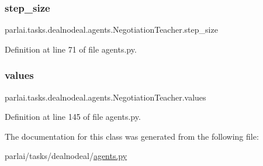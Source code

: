 \subsubsection{\texorpdfstring{step\+\_\+size}{step\_size}}
{\footnotesize\ttfamily parlai.\+tasks.\+dealnodeal.\+agents.\+Negotiation\+Teacher.\+step\+\_\+size}



Definition at line 71 of file agents.\+py.

\mbox{\label{classparlai_1_1tasks_1_1dealnodeal_1_1agents_1_1NegotiationTeacher_a9d33952ac00bfe1ca5a4b1f8311dc617}} 
\subsubsection{\texorpdfstring{values}{values}}
{\footnotesize\ttfamily parlai.\+tasks.\+dealnodeal.\+agents.\+Negotiation\+Teacher.\+values}



Definition at line 145 of file agents.\+py.



The documentation for this class was generated from the following file\+:\begin{DoxyCompactItemize}
\item 
parlai/tasks/dealnodeal/\hyperlink{parlai_2tasks_2dealnodeal_2agents_8py}{agents.\+py}\end{DoxyCompactItemize}
